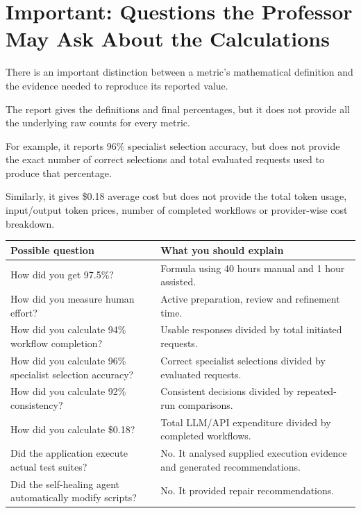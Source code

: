 \documentclass[11pt,a4paper]{article}
\begin{document}
\section{Important: Questions the Professor May Ask About the Calculations}

There is an important distinction between a metric's mathematical definition and the evidence needed to reproduce its reported value.

The report gives the definitions and final percentages, but it does not provide all the underlying raw counts for every metric.

For example, it reports 96\% specialist selection accuracy, but does not provide the exact number of correct selections and total evaluated requests used to produce that percentage.

Similarly, it gives \$0.18 average cost but does not provide the total token usage, input/output token prices, number of completed workflows or provider-wise cost breakdown.

\begin{center}
\begin{tabularx}{\textwidth}{p{}X}
\toprule
\textbf{Possible question} & \textbf{What you should explain}\\
\midrule
How did you get 97.5\%? & Formula using 40 hours manual and 1 hour assisted.\\
How did you measure human effort? & Active preparation, review and refinement time.\\
How did you calculate 94\% workflow completion? & Usable responses divided by total initiated requests.\\
How did you calculate 96\% specialist selection accuracy? & Correct specialist selections divided by evaluated requests.\\
How did you calculate 92\% consistency? & Consistent decisions divided by repeated-run comparisons.\\
How did you calculate \$0.18? & Total LLM/API expenditure divided by completed workflows.\\
Did the application execute actual test suites? & No. It analysed supplied execution evidence and generated recommendations.\\
Did the self-healing agent automatically modify scripts? & No. It provided repair recommendations.\\
\bottomrule
\end{tabularx}
\end{center}
\end{document}
